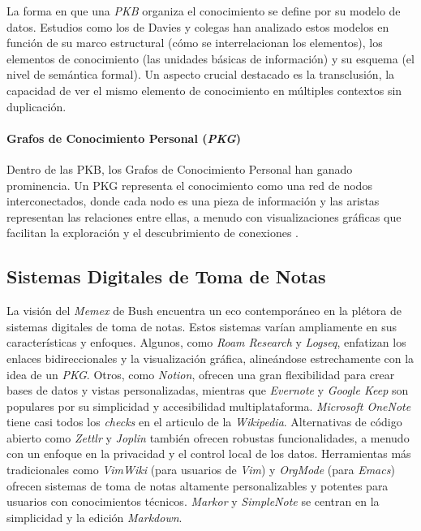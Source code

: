 \newpage

La forma en que una \textit{PKB} organiza el conocimiento se define por su modelo de datos. Estudios como los de Davies y colegas \parencite{daviesBuildingMemexSixty2005, daviesStillBuildingMemex2011} han analizado estos modelos en función de su marco estructural (cómo se interrelacionan los elementos), los elementos de conocimiento (las unidades básicas de información) y su esquema (el nivel de semántica formal). Un aspecto crucial destacado es la transclusión, la capacidad de ver el mismo elemento de conocimiento en múltiples contextos sin duplicación.

\paragraph{Grafos de Conocimiento Personal (\textit{PKG})}
Dentro de las PKB, los Grafos de Conocimiento Personal han ganado prominencia. Un PKG representa el conocimiento como una red de nodos interconectados, donde cada nodo es una pieza de información y las aristas representan las relaciones entre ellas, a menudo con visualizaciones gráficas que facilitan la exploración y el descubrimiento de conexiones \parencite{pyneMetaworkHowWe2022}.

\subsection{Sistemas Digitales de Toma de Notas}
\label{subsec:sistemas_digitales_toma_notas}
La visión del \textit{Memex} de Bush encuentra un eco contemporáneo en la plétora de sistemas digitales de toma de notas. Estos sistemas varían ampliamente en sus características y enfoques. Algunos, como \textit{Roam Research} y \textit{Logseq}, enfatizan los enlaces bidireccionales y la visualización gráfica, alineándose estrechamente con la idea de un \textit{PKG}. Otros, como \textit{Notion}, ofrecen una gran flexibilidad para crear bases de datos y vistas personalizadas, mientras que \textit{Evernote} y \textit{Google Keep} son populares por su simplicidad y accesibilidad multiplataforma. \textit{Microsoft OneNote} tiene casi todos los \textit{checks} en el articulo de la \textit{Wikipedia}. Alternativas de código abierto como \textit{Zettlr} y \textit{Joplin} también ofrecen robustas funcionalidades, a menudo con un enfoque en la privacidad y el control local de los datos. Herramientas más tradicionales como \textit{VimWiki} (para usuarios de \textit{Vim}) y \textit{OrgMode} (para \textit{Emacs}) ofrecen sistemas de toma de notas altamente personalizables y potentes para usuarios con conocimientos técnicos. \textit{Markor} y \textit{SimpleNote} se centran en la simplicidad y la edición \textit{Markdown}.

